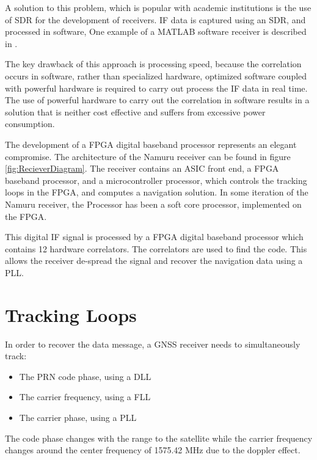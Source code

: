 A solution to this problem, which is popular with academic institutions is the use of \ac{SDR} for the development of receivers. \ac{IF} data is captured using an \ac{SDR}, and processed in software\cite{Glennon11aquariusfirmware}, One example of a MATLAB software receiver is described in \cite{KaiBorre}.

The key drawback of this approach is processing speed, because the correlation occurs in software, rather than specialized hardware, optimized software coupled with powerful hardware is required to carry out process the \ac{IF} data in real time. The use of powerful hardware to carry out the correlation in software results in a solution that is neither cost effective and suffers from excessive power consumption.

The development of a \ac{FPGA} digital baseband processor represents an elegant compromise. 
The architecture of the Namuru receiver can be found in figure \ref{fig:RecieverDiagram}. The receiver contains an ASIC front end, a FPGA baseband processor, and a microcontroller processor, which controls the tracking loops in the FPGA, and computes a navigation solution. In some iteration of the Namuru receiver, the Processor has been a soft core processor, implemented on the \ac{FPGA}.

This digital \ac{IF} signal is processed by a \ac{FPGA} digital baseband processor which contains 12 hardware correlators. The correlators are used to find the code. This allows the receiver de-spread the signal and recover the navigation data using a \ac{PLL}.

\section{Tracking Loops}

In order to recover the data message, a \ac{GNSS} receiver needs to simultaneously track:

\begin{itemize}
\item{The \ac{PRN} code phase, using a \ac{DLL}} 
\item{The carrier frequency, using a \ac{FLL}}
\item{The carrier phase, using a \ac{PLL}}
\end{itemize}


The code phase changes with the range to the satellite while the carrier frequency changes around the center frequency of 1575.42 MHz due to the doppler effect\cite{Tsui}.

